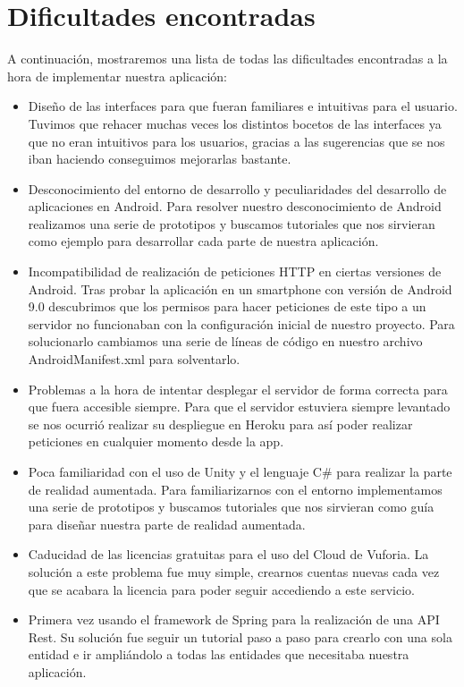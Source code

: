 \section{Dificultades encontradas}
\label{makereference4.5}
A continuación, mostraremos una lista de todas las dificultades encontradas a la hora de implementar nuestra aplicación:
\begin{itemize}
    \item Diseño de las interfaces para que fueran familiares e intuitivas para el usuario. Tuvimos que rehacer muchas veces los distintos bocetos de las interfaces ya que no eran intuitivos para los usuarios, gracias a las sugerencias que se nos iban haciendo conseguimos mejorarlas bastante.
    \item Desconocimiento del entorno de desarrollo y peculiaridades del desarrollo de aplicaciones en Android. Para resolver nuestro desconocimiento de Android realizamos una serie de prototipos y buscamos tutoriales que nos sirvieran como ejemplo para desarrollar cada parte de nuestra aplicación.
    \item Incompatibilidad de realización de peticiones HTTP en ciertas versiones de Android. Tras probar la aplicación en un smartphone con versión de Android 9.0 descubrimos que los permisos para hacer peticiones de este tipo a un servidor no funcionaban con la configuración inicial de nuestro proyecto. Para solucionarlo cambiamos una serie de líneas de código en nuestro archivo AndroidManifest.xml para solventarlo.
    \item Problemas a la hora de intentar desplegar el servidor de forma correcta para que fuera accesible siempre. Para que el servidor estuviera siempre levantado se nos ocurrió realizar su despliegue en Heroku para así poder realizar peticiones en cualquier momento desde la app.
    \item Poca familiaridad con el uso de Unity y el lenguaje C\# para realizar la parte de realidad aumentada. Para familiarizarnos con el entorno implementamos una serie de prototipos y buscamos tutoriales que nos sirvieran como guía para diseñar nuestra parte de realidad aumentada. 
    \item Caducidad de las licencias gratuitas para el uso del Cloud de Vuforia. La solución a este problema fue muy simple, crearnos cuentas nuevas cada vez que se acabara la licencia para poder seguir accediendo a este servicio.
    \item Primera vez usando el framework de Spring para la realización de una API Rest. Su solución fue seguir un tutorial paso a paso para crearlo con una sola entidad e ir ampliándolo a todas las entidades que necesitaba nuestra aplicación.

\end{itemize}
